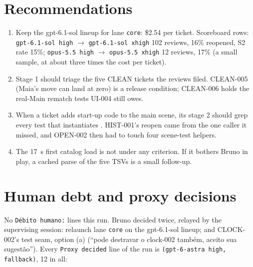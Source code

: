 \documentclass[11pt,a4paper]{article}
\begin{document}
\section*{Recommendations}

\begin{enumerate}
  \item Keep the gpt-6.1-sol lineup for lane \texttt{core}: \$2.54 per ticket. Scoreboard
        rows: \texttt{gpt-6.1-sol high} $\rightarrow$ \texttt{gpt-6.1-sol xhigh} 102 reviews,
        16\% reopened, S2 rate 15\%; \texttt{opus-5.5 high} $\rightarrow$
        \texttt{opus-5.5 xhigh} 12 reviews, 17\% (a small sample, at about three times the cost
        per ticket).
  \item Stage 1 should triage the five CLEAN tickets the reviews filed. CLEAN-005 (Maia's move
        can land at zero) is a release condition; CLEAN-006 holds the real-Main rematch tests
        UI-004 still owes.
  \item When a ticket adds start-up code to the main scene, its stage 2 should grep every test
        that instantiates . HIST-001's reopen came from the one caller it
        missed, and OPEN-002 then had to touch four scene-test helpers.
  \item The 17~s first catalog load is not under any criterion. If it bothers Bruno in play,
        a cached parse of the five TSVs is a small follow-up.
\end{enumerate}

\section*{Human debt and proxy decisions}

No \texttt{Débito humano:} lines this run. Bruno decided twice, relayed by the supervising
session: relaunch lane \texttt{core} on the gpt-6.1-sol lineup; and CLOCK-002's test seam,
option (a) (``pode destravar o clock-002 também, aceito sua sugestão''). Every
\texttt{Proxy decided} line of the run is \texttt{(gpt-6-astra high, fallback)}, 12 in all:
\end{document}
